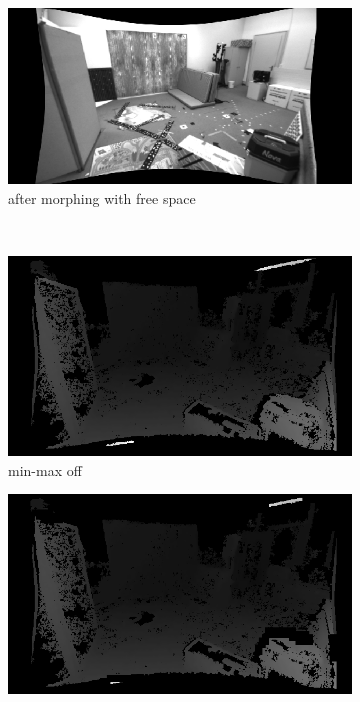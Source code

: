 \documentclass[12pt,titlepage, a4paper]{article}
\begin{document}
\begin{figure}[h!]
	\centering{}
	\begin{subfigure}[h]{0.45\textwidth}
		\includegraphics[width=\textwidth]{./jumpEdge/camera.png}
		\caption{after morphing with free space}
	\end{subfigure}\\
	\begin{subfigure}[h]{0.45\textwidth}
		\includegraphics[width=\textwidth]{./jumpEdge/je_off_disparity.png}
		\caption{min-max off}
	\end{subfigure}
	\begin{subfigure}[h]{0.45\textwidth}
		\includegraphics[width=\textwidth]{./jumpEdge/je_on_disparity.png}

\end{subfigure}
\end{figure}
\end{document}
